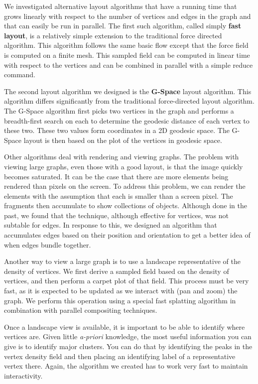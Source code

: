 \documentclass[pdf,12pt,report,strict]{SANDreport}
\newcommand*{\keyterm}[1]{\textbf{#1}}
\begin{document}

We investigated alternative layout algorithms that have a running time that
grows linearly with respect to the number of vertices and edges in the
graph and that can easily be run in parallel.  The first such algorithm,
called simply \keyterm{fast layout}, is a relatively
simple extension to the traditional force directed algorithm.  This
algorithm follows the same basic flow except that the force field is
computed on a finite mesh.  This sampled field can be computed in linear
time with respect to the vertices and can be combined in parallel with a
simple reduce command.


The second layout algorithm we designed is the
\keyterm{G-Space} layout algorithm.  This algorithm differs
significantly from the traditional force-directed layout algorithm.  The
G-Space algorithm first picks two vertices in the graph and performs a
breadth-first search on each to determine the geodesic distance of each
vertex to these two.  These two values form coordinates in a 2D geodesic
space.  The G-Space layout is then based on the plot of the vertices in
geodesic space.

Other algorithms deal with rendering and viewing graphs.  The problem with
viewing large graphs, even those with a good layout, is that the image
quickly becomes saturated.  It can be the case that there are more elements
being rendered than pixels on the screen.  To address this problem, we can
render the elements with the assumption that each is smaller than a screen
pixel.  The fragments then accumulate to show collections of objects.
Although done in the past, we found that the technique, although effective
for vertices, was not subtable for edges.  In response to this, we designed
an algorithm that accumulates edges based on their position and orientation
to get a better idea of when edges bundle together.

Another way to view a large graph is to use a landscape representative of
the density of vertices.  We first derive a sampled field based on the
density of vertices, and then perform a carpet plot of that field.  This
process must be very fast, as it is expected to be updated as we interact
with (pan and zoom) the graph.  We perform this operation using a special
fast splatting algorithm in combination with parallel compositing
techniques.

Once a landscape view is available, it is important to be able to identify
where vertices are.  Given little \emph{a-priori} knowledge, the most
useful information you can give is to identify major clusters.  You can do
that by identifying the peaks in the vertex density field and then placing
an identifying label of a representative vertex there.  Again, the
algorithm we created has to work very fast to maintain interactivity.
\end{document}
